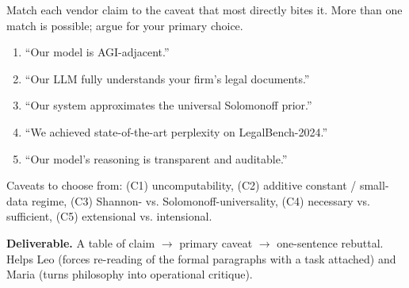 \begin{activity}[title={Activity 8.4 --- Claim-to-caveat matching}]
Match each vendor claim to the caveat that most directly bites it.
More than one match is possible; argue for your primary choice.

\begin{enumerate}[leftmargin=1.4em,itemsep=2pt]
  \item ``Our model is AGI-adjacent.''
  \item ``Our LLM fully understands your firm's legal documents.''
  \item ``Our system approximates the universal Solomonoff prior.''
  \item ``We achieved state-of-the-art perplexity on
        LegalBench-2024.''
  \item ``Our model's reasoning is transparent and auditable.''
\end{enumerate}

Caveats to choose from: (C1) uncomputability, (C2) additive constant
/ small-data regime, (C3) Shannon- vs. Solomonoff-universality,
(C4) necessary vs. sufficient, (C5) extensional vs. intensional.

\textbf{Deliverable.} A table of claim $\to$ primary caveat $\to$
one-sentence rebuttal. Helps Leo (forces re-reading of the formal
paragraphs with a task attached) and Maria (turns philosophy into
operational critique).
\end{activity}

